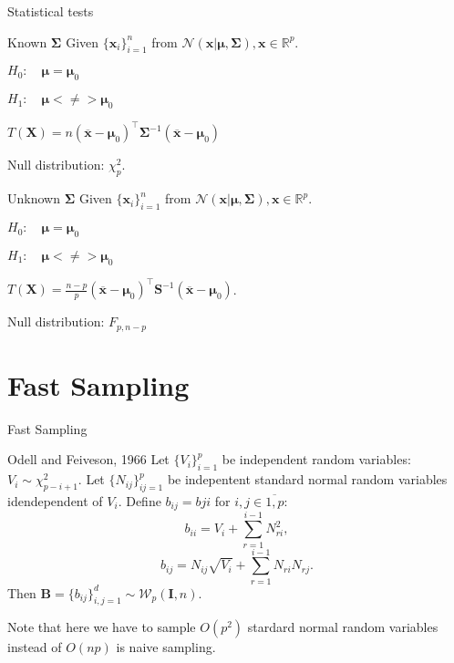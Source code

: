 \documentclass{beamer}
\begin{document}
\begin{frame}{Statistical tests}

    \begin{block}{Known $\mathbf{\Sigma}$}
        Given $\{\mathbf{x}_i\}_{i=1}^n$ from $\mathcal{N}(\mathbf{x}|\boldsymbol\mu, \mathbf{\Sigma}),
        \mathbf{x} \in \mathbb{R}^p$.

        $H_0: \quad \boldsymbol\mu = \boldsymbol\mu_0$

        $H_1: \quad \boldsymbol\mu <\not= > \boldsymbol\mu_0$

        $T(\mathbf{X}) = n(\overline{\mathbf{x}} - \boldsymbol\mu_0)^\top\mathbf{\Sigma}^{-1}(\overline{\mathbf{x}} - \boldsymbol\mu_0)$

        Null distribution: $\chi^2_p$.
    \end{block}

    \begin{block}{Unknown $\mathbf{\Sigma}$}
        Given $\{\mathbf{x}_i\}_{i=1}^n$ from $\mathcal{N}(\mathbf{x}|\boldsymbol\mu, \mathbf{\Sigma}),
        \mathbf{x} \in \mathbb{R}^p$.

        $H_0: \quad \boldsymbol\mu = \boldsymbol\mu_0$

        $H_1: \quad \boldsymbol\mu <\not= > \boldsymbol\mu_0$

        $T(\mathbf{X}) = \frac{n-p}{p}(\overline{\mathbf{x}} - \boldsymbol\mu_0)^\top\mathbf{S}^{-1}(\overline{\mathbf{x}} - \boldsymbol\mu_0)$.

        Null distribution: $F_{p, n-p}$

    \end{block}

\end{frame}


\section{Fast Sampling}

\begin{frame}{Fast Sampling}
    \begin{block}{Odell and Feiveson, 1966}
        Let $\{V_i\}_{i=1}^p$ be independent random variables: $V_i \sim \chi^2_{p - i + 1}$. Let $\{N_{ij}\}_{ij=1}^p$
        be indepentent standard normal random variables idendependent of $V_i$. Define $b_{ij} = b{ji}$ for $i, j \in \overline{1,p}$:
        \[
            b_{ii} = V_i + \sum_{r=1}^{i-1}N^2_{ri},
        \]
        \[
            b_{ij} = N_{ij}\sqrt{V_i} + \sum_{r=1}^{i-1}N_{ri}N_{rj}.
        \]
        Then $\mathbf{B} = \{b_{ij}\}_{i, j=1}^d \sim \mathcal{W}_p(\mathbf{I}, n)$.
    \end{block}
    Note that here we have to sample $O(p^2)$ stardard normal random variables instead of $O(np)$
    is naive sampling.
\end{frame}
\end{document}
